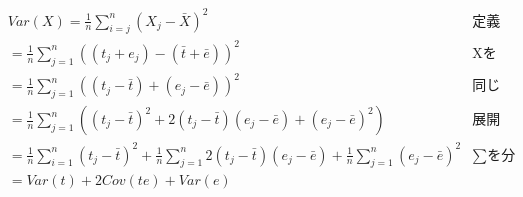 \begin{align*}
	 & Var(X)  =  \frac{1}{n}\sum_{i=j}^n (X_j - \bar{X})^2                                                                                              & \mbox{定義より}         \\
	 & = \frac{1}{n}\sum_{j=1}^n  ((t_j + e_j) - (\bar{t} + \bar{e}))^2                                                                                  & \mbox{Xをテスト理論のモデルに} \\
	 & = \frac{1}{n}\sum_{j=1}^n (  (t_j - \bar{t}) + (e_j - \bar{e}) )^2                                                                                & \mbox{同じ記号でまとめる}    \\
	 & = \frac{1}{n}\sum_{j=1}^n (  (t_j - \bar{t})^2 + 2(t_j - \bar{t})(e_j - \bar{e}) + (e_j - \bar{e})^2  )                                           & \mbox{展開する}         \\
	 & = \frac{1}{n}\sum_{i=1}^n (t_j - \bar{t})^2 +\frac{1}{n}\sum_{j=1}^n 2(t_j - \bar{t})(e_j - \bar{e})  + \frac{1}{n}\sum_{j=1}^n (e_j - \bar{e})^2 & \mbox{$\sum$を分配}    \\
	 & =  Var(t) + 2Cov(te) + Var(e)
\end{align*}

